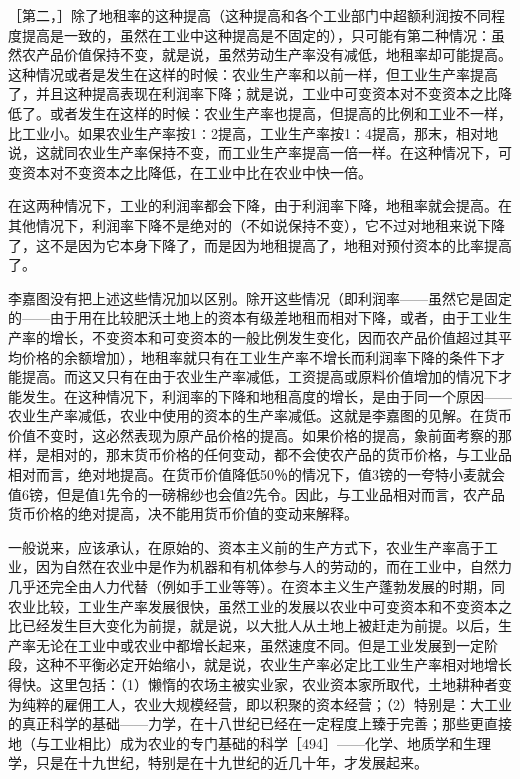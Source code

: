 ［第二，］除了地租率的这种提高（这种提高和各个工业部门中超额利润按不同程度提高是一致的，虽然在工业中这种提高是不固定的），只可能有第二种情况：虽然农产品价值保持不变，就是说，虽然劳动生产率没有减低，地租率却可能提高。这种情况或者是发生在这样的时候：农业生产率和以前一样，但工业生产率提高了，并且这种提高表现在利润率下降；就是说，工业中可变资本对不变资本之比降低了。或者发生在这样的时候：农业生产率也提高，但提高的比例和工业不一样，比工业小。如果农业生产率按1∶2提高，工业生产率按1∶4提高，那末，相对地说，这就同农业生产率保持不变，而工业生产率提高一倍一样。在这种情况下，可变资本对不变资本之比降低，在工业中比在农业中快一倍。

在这两种情况下，工业的利润率都会下降，由于利润率下降，地租率就会提高。在其他情况下，利润率下降不是绝对的（不如说保持不变），它不过对地租来说下降了，这不是因为它本身下降了，而是因为地租提高了，地租对预付资本的比率提高了。

李嘉图没有把上述这些情况加以区别。除开这些情况（即利润率——虽然它是固定的——由于用在比较肥沃土地上的资本有级差地租而相对下降，或者，由于工业生产率的增长，不变资本和可变资本的一般比例发生变化，因而农产品价值超过其平均价格的余额增加），地租率就只有在工业生产率不增长而利润率下降的条件下才能提高。而这又只有在由于农业生产率减低，工资提高或原料价值增加的情况下才能发生。在这种情况下，利润率的下降和地租高度的增长，是由于同一个原因——农业生产率减低，农业中使用的资本的生产率减低。这就是李嘉图的见解。在货币价值不变时，这必然表现为原产品价格的提高。如果价格的提高，象前面考察的那样，是相对的，那末货币价格的任何变动，都不会使农产品的货币价格，与工业品相对而言，绝对地提高。在货币价值降低50％的情况下，值3镑的一夸特小麦就会值6镑，但是值1先令的一磅棉纱也会值2先令。因此，与工业品相对而言，农产品货币价格的绝对提高，决不能用货币价值的变动来解释。

一般说来，应该承认，在原始的、资本主义前的生产方式下，农业生产率高于工业，因为自然在农业中是作为机器和有机体参与人的劳动的，而在工业中，自然力几乎还完全由人力代替（例如手工业等等）。在资本主义生产蓬勃发展的时期，同农业比较，工业生产率发展很快，虽然工业的发展以农业中可变资本和不变资本之比已经发生巨大变化为前提，就是说，以大批人从土地上被赶走为前提。以后，生产率无论在工业中或农业中都增长起来，虽然速度不同。但是工业发展到一定阶段，这种不平衡必定开始缩小，就是说，农业生产率必定比工业生产率相对地增长得快。这里包括：（1）懒惰的农场主被实业家，农业资本家所取代，土地耕种者变为纯粹的雇佣工人，农业大规模经营，即以积聚的资本经营；（2）特别是：大工业的真正科学的基础——力学，在十八世纪已经在一定程度上臻于完善；那些更直接地（与工业相比）成为农业的专门基础的科学［494］——化学、地质学和生理学，只是在十九世纪，特别是在十九世纪的近几十年，才发展起来。

